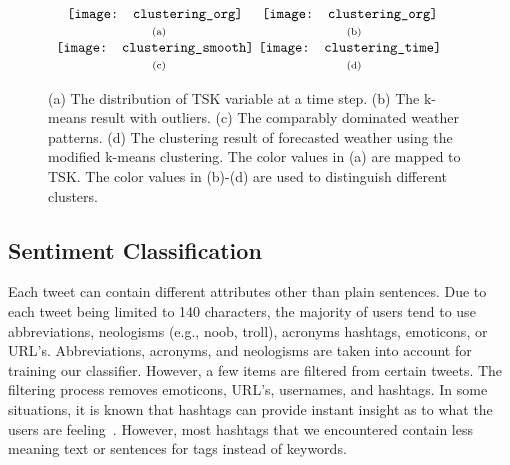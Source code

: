\begin{figure}[t]
\begin{center}
$\begin{array}{c@{\hspace{0.01\linewidth}}c}
\texttt{[image: clustering\_org]} &
\texttt{[image: clustering\_org]}
\\
\mbox{\small{(a)}} & \mbox{\small{(b)}}
\\
\texttt{[image: clustering\_smooth]} &
\texttt{[image: clustering\_time]}
\\
\mbox{\small{(c)}} & \mbox{\small{(d)}}
\end{array}$
\end{center}
\vspace{-.1in}
\caption{(a) The distribution of TSK variable at a time step. (b) The k-means result with outliers. (c) The comparably dominated weather patterns. (d) The clustering result of forecasted weather using the modified k-means clustering. The color values in (a) are mapped to TSK. The color values in (b)-(d) are used to distinguish different clusters.}
\label{fig:clustering}
\end{figure}

\subsection{Sentiment Classification}
\label{sec:senti}

Each tweet can contain different attributes other than plain sentences. Due to each tweet being limited to 140 characters, the majority of users tend to use abbreviations, neologisms (e.g., noob, troll), acronyms hashtags, emoticons, or URL's. Abbreviations, acronyms, and neologisms are taken into account for training our classifier. However, a few items are filtered from certain tweets. The filtering process removes emoticons, URL's, usernames, and hashtags. In some situations, it is known that hashtags can provide instant insight as to what the users are feeling~\cite{keller2005warm}. However, most hashtags that we encountered contain less meaning text or sentences for tags instead of keywords.

